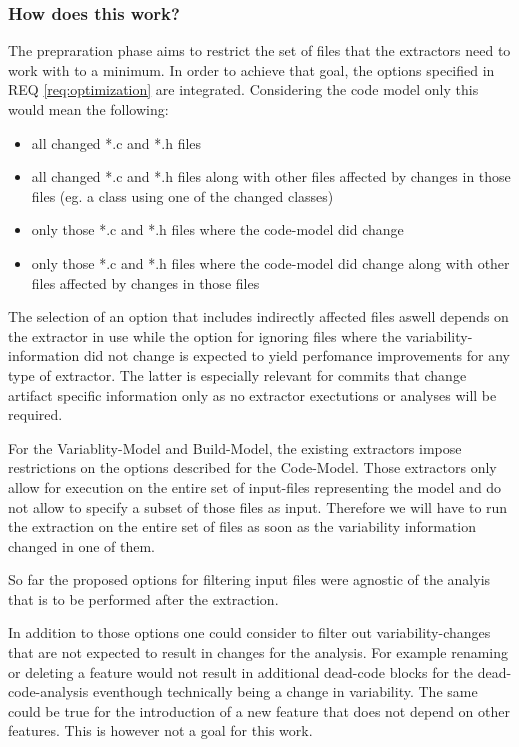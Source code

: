 \documentclass[a4paper]{article}
\begin{document}
\subsubsection{How does this work?}

The prepraration phase aims to restrict the set of files that the extractors need to work with to a minimum. In order to achieve that goal, the options specified in REQ \ref{req:optimization}  are integrated. Considering the code model only this would mean the following:

\begin{itemize}
	\item all changed *.c and *.h files
	\item all changed *.c and *.h files along with other files affected by changes in those files (eg. a class using one of the changed classes)
	\item only those *.c and *.h files where the code-model did change
	\item only those *.c and *.h files where the code-model did change along with other files affected by changes in those files
\end{itemize}

The selection of an option that includes indirectly affected files aswell depends on the extractor in use while the option for ignoring files where the variability-information did not change is expected to yield perfomance improvements for any type of extractor. The latter is especially relevant for commits that change artifact specific information only as no extractor exectutions or analyses will be required.

For the Variablity-Model and Build-Model, the existing extractors impose restrictions on the options described for the Code-Model. Those extractors only allow for execution on the entire set of input-files representing the model and do not allow to specify a subset of those files as input. Therefore we will have to run the extraction on the entire set of files as soon as the variability information changed in one of them.

So far the proposed options for filtering input files were agnostic of the analyis that is to be performed after the extraction.

In addition to those options one could consider to filter out variability-changes that are not expected to result in changes for the analysis. For example renaming or deleting a feature would not result in additional dead-code blocks for the dead-code-analysis eventhough technically being a change in variability. The same could be true for the introduction of a new feature that does not depend on other features. This is however not a goal for this work.
\end{document}
